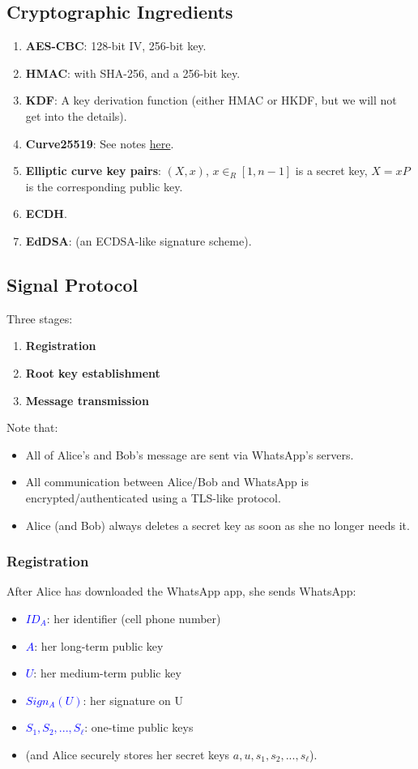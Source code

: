 \documentclass[12pt,titlepage]{article}
\begin{document}
\subsection{Cryptographic Ingredients}
\begin{enumerate}
	\item \textbf{AES-CBC}: 128-bit IV, 256-bit key.
	\item \textbf{HMAC}: with SHA-256, and a 256-bit key.
	\item \textbf{KDF}: A key derivation function (either HMAC or HKDF, but we will not get into the details).
	\item \textbf{Curve25519}: See notes \hyperlink{subsubsection.8.3.2}{here}.
	\item \textbf{Elliptic curve key pairs}: $(X, x)$, $x \in_R [1, n-1]$ is a secret key, $X = xP$ is the corresponding public key.
	\item \textbf{ECDH}.
	\item \textbf{EdDSA}: (an ECDSA-like signature scheme).
\end{enumerate}
\subsection{Signal Protocol}
Three stages: \begin{enumerate}
	\item \textbf{Registration}
	\item \textbf{Root key establishment}
	\item \textbf{Message transmission}
\end{enumerate} 
Note that: \begin{itemize}
	\item All of Alice’s and Bob’s message are sent via WhatsApp’s servers.
	\item All communication between Alice/Bob and WhatsApp is encrypted/authenticated using a TLS-like protocol.
	\item Alice (and Bob) always deletes a secret key as soon as she no longer needs it.
\end{itemize} 
\subsubsection{Registration}
After Alice has downloaded the WhatsApp app, she sends WhatsApp:\begin{itemize}
	\item \textcolor{blue}{$ID_A$}: her identifier (cell phone number)
	\item \textcolor{blue}{$A$}: her long-term public key
	\item \textcolor{blue}{$U$}: her medium-term public key
	\item \textcolor{blue}{$Sign_A (U)$}: her signature on U
	\item \textcolor{blue}{$S_1, S_2, ..., S_\ell$}: one-time public keys
	\item (and Alice securely stores her secret keys $a, u, s_1, s_2, ..., s_\ell$).
\end{itemize}
\end{document}
